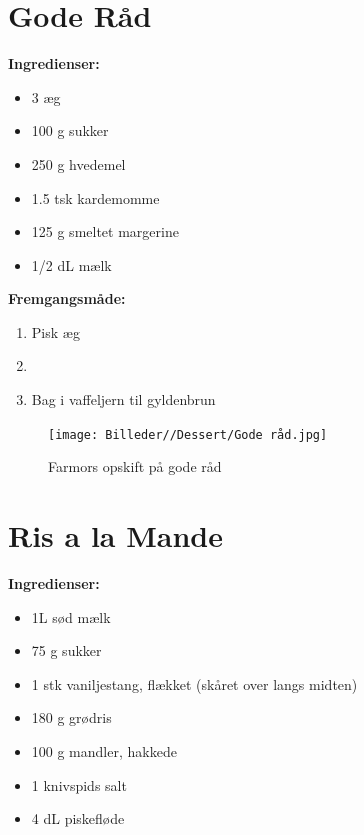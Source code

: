 \documentclass{book}
\begin{document}
\newpage \section{Gode Råd}
\begin{minipage}[t]{0.5\textwidth}
\textbf{Ingredienser:}
\begin{itemize}
    \item 3 æg
    \item 100 g sukker
    \item 250 g hvedemel
    \item 1.5 tsk kardemomme 
    \item 125 g smeltet margerine
    \item 1/2 dL mælk
\end{itemize}
\end{minipage}
\begin{minipage}[t]{0.5\textwidth}
\textbf{Fremgangsmåde:}
\begin{enumerate}
    \item Pisk æg 
    \item 
    \item Bag i vaffeljern til gyldenbrun
\end{enumerate}
\end{minipage}
\begin{figure}
    \centering
    \texttt{[image: Billeder//Dessert/Gode råd.jpg]}
    \caption{Farmors opskift på gode råd}
\end{figure}
\newpage \section{Ris a la Mande}
\begin{minipage}[t]{0.5\textwidth}
\textbf{Ingredienser:}
\begin{itemize}
    \item 1L sød mælk
    \item 75 g sukker
    \item 1 stk vaniljestang, flækket (skåret over langs midten)
    \item 180 g grødris
    \item 100 g mandler, hakkede
    \item 1 knivspids salt
    \item 4 dL piskefløde
\end{itemize}
\end{minipage}
\end{document}
